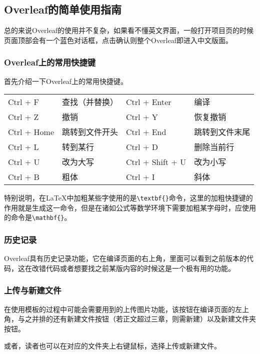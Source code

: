 \subsection{Overleaf的简单使用指南}

总的来说Overleaf的使用并不复杂，如果看不懂英文界面，一般打开项目页的时候页面顶部会有一个蓝色对话框，点击确认则整个Overleaf即进入中文版面。

\subsubsection{Overleaf上的常用快捷键}

首先介绍一下Overleaf上的常用快捷键。

\begin{table}[ht]\centering
\begin{tabular}{l l l l}
\hline
Ctrl + F & 查找（并替换）& Ctrl + Enter & 编译 \\
Ctrl + Z & 撤销 & Ctrl + Y & 恢复撤销 \\
Ctrl + Home & 跳转到文件开头 & Ctrl + End & 跳转到文件末尾 \\
Ctrl + L & 转到某行 & Ctrl + D & 删除当前行 \\
Ctrl + U & 改为大写 & Ctrl + Shift + U & 改为小写 \\
Ctrl + B & 粗体 & Ctrl + I & 斜体 \\
\hline
\end{tabular}
\end{table}
特别说明，在LaTeX中加粗某些字使用的是\verb|\textbf{}|命令，这里的加粗快捷键的作用就是生成这一命令，但是在诸如公式等数学环境下需要加粗某字母时，应使用的命令是\verb|\mathbf{}|。

\subsubsection{历史记录}

Overleaf具有历史记录功能，它在编译页面的右上角，里面可以看到之前版本的代码，这在改错代码或者想要找之前某版内容的时候这是一个极有用的功能。

\subsubsection{上传与新建文件}

在使用模板的过程中可能会需要用到的上传图片功能，该按钮在编译页面的左上角，与之并排的还有新建文件按钮（若正文超过三章，则需新建）以及新建文件夹按钮。

或者，读者也可以在对应的文件夹上右键鼠标，选择上传或新建文件。

